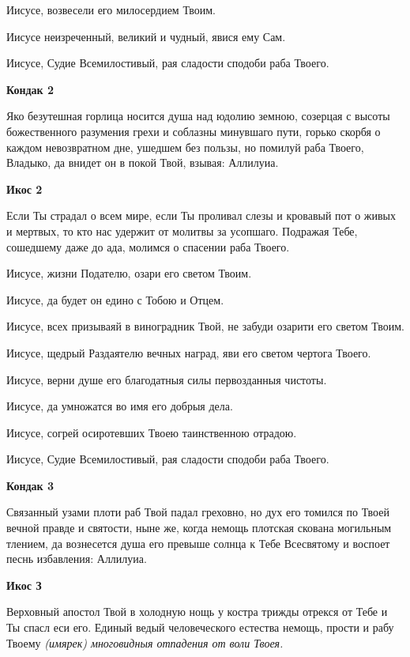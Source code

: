 Иисусе, возвесели его милосердием Твоим. 


Иисусе неизреченный, великий и чудный, явися ему Сам. 


Иисусе, Судие Всемилостивый, рая сладости сподоби раба Твоего.




\bfseries Кондак 2\normalfont{}


Яко безутешная горлица носится душа над юдолию земною, созерцая с высоты божественного разумения грехи и соблазны минувшаго пути, горько скорбя о каждом невозвратном дне, ушедшем без пользы, но помилуй раба Твоего, Владыко, да внидет он в покой Твой, взывая: Аллилуиа.




\bfseries Икос 2\normalfont{}


Если Ты страдал о всем мире, если Ты проливал слезы и кровавый пот о живых и мертвых, то кто нас удержит от молитвы за усопшаго. Подражая Тебе, сошедшему даже до ада, молимся о спасении раба Твоего. 


Иисусе, жизни Подателю, озари его светом Твоим. 


Иисусе, да будет он едино с Тобою и Отцем. 


Иисусе, всех призываяй в виноградник Твой, не забуди озарити его светом Твоим. 


Иисусе, щедрый Раздаятелю вечных наград, яви его светом чертога Твоего. 


Иисусе, верни душе его благодатныя силы первозданныя чистоты. 


Иисусе, да умножатся во имя его добрыя дела. 


Иисусе, согрей осиротевших Твоею таинственною отрадою. 


Иисусе, Судие Всемилостивый, рая сладости сподоби раба Твоего.




\bfseries Кондак 3\normalfont{}


Связанный узами плоти раб Твой падал греховно, но дух его томился по Твоей вечной правде и святости, ныне же, когда немощь плотская скована могильным тлением, да вознесется душа его превыше солнца к Тебе Всесвятому и воспоет песнь избавления: Аллилуиа.




\bfseries Икос З\normalfont{}


Верховный апостол Твой в холодную нощь у костра трижды отрекся от Тебе и Ты спасл еси его. Единый ведый человеческого естества немощь, прости и рабу Твоему \itshape (имярек)\normalfont{} многовидныя отпадения от воли Твоея. 


